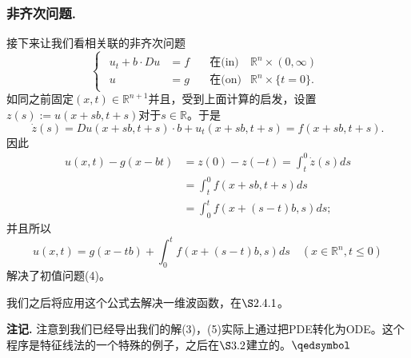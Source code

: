 \documentclass[leqno]{article}
\numberwithin{equation}{subsection}%
\begin{document}
\subsubsection{非齐次问题.}
接下来让我们看相关联的非齐次问题
\begin{equation}
\begin{cases}
\begin{aligned}
u_{t}+b\cdot Du&=f\quad&\text{在(in)}&\mathbb{R}^{n}\times(0,\infty)\\
u&=g\quad&\text{在(on)}&\mathbb{R}^{n}\times\{t=0\}.
\end{aligned}
\end{cases}
\end{equation}
如同之前固定$(x,t)\in\mathbb{R}^{n+1}$并且，受到上面计算的启发，设置$z(s):=u(x+sb,t+s)$对于$s\in\mathbb{R}$。于是
\begin{equation*}
\dot{z}(s)=Du(x+sb,t+s)\cdot b+u_{t}(x+sb,t+s)=f(x+sb,t+s).
\end{equation*}
因此
\begin{equation*}
\begin{aligned}
u(x,t)-g(x-bt)&=z(0)-z(-t)=\int_{t}^{0}\dot{z}(s)ds\\
&=\int_{t}^{0}f(x+sb,t+s)ds\\
&=\int_{0}^{t}f(x+(s-t)b,s)ds;
\end{aligned}
\end{equation*}
并且所以
\begin{equation}
u(x,t)=g(x-tb)+\int_{0}^{t}f(x+(s-t)b,s)ds\quad(x\in\mathbb{R}^{n},t\leq 0)
\end{equation}
解决了初值问题(4)。
\par
我们之后将应用这个公式去解决一维波函数，在$\S 2.4.1$。
\par
\noindent\textbf{注记.}
注意到我们已经导出我们的解(3)，(5)实际上通过把PDE转化为ODE。这个程序是特征线法的一个特殊的例子，之后在$\S 3.2$建立的。$\hfill\qedsymbol$
\end{document}
